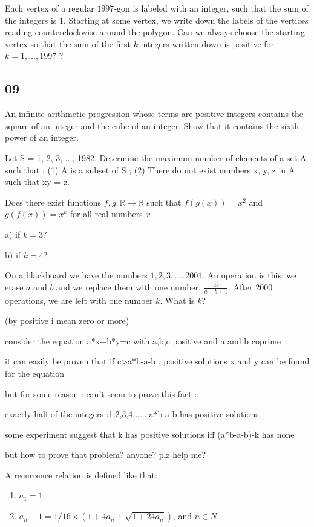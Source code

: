 \bq{}{}
Each vertex of a regular $1997$-gon is labeled with an integer, such that the sum of the integers is $1$. Starting at some vertex, we write down the labels of the vertices reading counterclockwise around the polygon.
Can we always choose the starting vertex so that the sum of the first $k$ integers written down is positive for $k =1,...,1997$ ?
\eq

\newpage
\subsection{09}
\bq{}{}
An infinite arithmetic progression whose terms are positive integers contains the square of an integer and the cube of an integer. Show that it contains the sixth power of an integer.
\eq

\bq{}{}
Let S = {1, 2, 3, ..., 1982}.
Determine the maximum number of elements of a set A such that :
(1) A is a subset of S ;
(2) There do not exist numbers x, y, z in A such that xy = z.
\eq

Does there exist functions $ f,g: \mathbb{R}\to\mathbb{R}$ such that $ f(g(x)) = x^2$ and $ g(f(x)) = x^k$ for all real numbers $ x$

a) if $ k = 3$?

b) if $ k = 4$?
\eq

\bq{}{}
On a blackboard we have the numbers $1, 2, 3, \ldots, 2001$. An operation is this: we erase $a$ and $b$ and we replace them with one number, $\frac{ab}{a+b+1}$. After 2000 operations, we are left with one number $k$. What is $k$?
\eq

\bq{}{}
(by positive i mean zero or more)

consider the equation a*x+b*y=c with a,b,c positive and a and b coprime

it can easily be proven that if c>a*b-a-b , positive solutions x and y can be found for the equation

but for some reason i can't seem to prove this fact :

exactly half of the integers :1,2,3,4,......a*b-a-b has positive solutions

some experiment suggest that k has positive solutions iff (a*b-a-b)-k has none

but how to prove that problem? anyone?
plz help me?
\eq

\bq{}{}
A recurrence relation is defined like that:
\begin{enumerate}[(1)]
 \item $a_1=1$;
 \item $a_n+1 = 1/16 \times (1 + 4a_n + \sqrt{1 + 24a_n})$, 
and $n \in N$
\end{enumerate}

